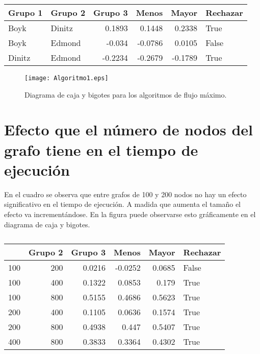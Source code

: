 \documentclass{article}
\begin{document}
\begin{table}[htbp]
  \centering
  \caption{}
    \begin{tabular}{|l|l|r|r|r|l|}
    \toprule
    \rowcolor[rgb]{ .357,  .608,  .835} \textbf{Grupo 1} & \textbf{Grupo 2} & \multicolumn{1}{l|}{\textbf{Grupo 3}} & \multicolumn{1}{l|}{\textbf{Menos}} & \multicolumn{1}{l|}{\textbf{Mayor}} & \textbf{Rechazar} \\
    \midrule
    Boyk  & Dinitz & 0.1893 & 0.1448 & 0.2338 & True \\
    \midrule
    Boyk  & Edmond & -0.034 & -0.0786 & 0.0105 & False \\
    \midrule
    Dinitz & Edmond & -0.2234 & -0.2679 & -0.1789 & True \\
    \bottomrule
    \end{tabular}%
  \label{tab:Cuadro 2}%
\end{table}%

\begin{figure}
\begin{center}
  \texttt{[image: Algoritmo1.eps]}
\end{center}
\vspace*{-8mm}
\caption{Diagrama de caja y bigotes para los algoritmos de flujo máximo.}
  \label{Figura 3} 
\end{figure}

\section*{Efecto que el número de nodos del grafo tiene en el tiempo de ejecución}

En el cuadro \pageref{Cuadro 3} se observa que entre grafos de 100 y 200 nodos no hay un efecto significativo en el tiempo de ejecución. A madida que aumenta el tamaño el efecto va incrementándose. En la figura \pageref{Figura 4} puede observarse esto gráficamente en el diagrama de caja y bigotes. 


\begin{table}[htbp]
  \centering
  \caption{}
    \begin{tabular}{rrrrrl}
    \toprule
    \rowcolor[rgb]{ .357,  .608,  .835} \multicolumn{1}{|l|}{\textbf{Grupo 1}} & \multicolumn{1}{l|}{\textbf{Grupo 2}} & \multicolumn{1}{l|}{\textbf{Grupo 3}} & \multicolumn{1}{l|}{\textbf{Menos}} & \multicolumn{1}{l|}{\textbf{Mayor}} & \multicolumn{1}{l|}{\textbf{Rechazar}} \\
    \midrule
    100   & 200   & 0.0216 & -0.0252 & 0.0685 & False \\
    100   & 400   & 0.1322 & 0.0853 & 0.179 & True \\
    100   & 800   & 0.5155 & 0.4686 & 0.5623 & True \\
    200   & 400   & 0.1105 & 0.0636 & 0.1574 & True \\
    200   & 800   & 0.4938 & 0.447 & 0.5407 & True \\
    400   & 800   & 0.3833 & 0.3364 & 0.4302 & True \\
    \end{tabular}%
  \label{tab:Cuadro 3}
\end{table}
\end{document}
